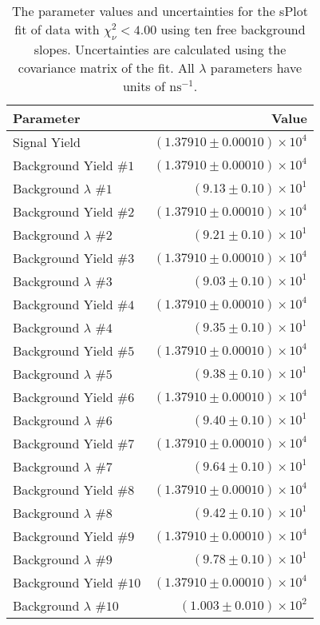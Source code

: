 
\begin{table}[h]
    \begin{center}
        \begin{tabular}{lr}\toprule
            Parameter & Value \\\midrule
            Signal Yield & $(1.37910 \pm 0.00010) \times 10^{4}$ \\
            Background Yield $\#1$ & $(1.37910 \pm 0.00010) \times 10^{4}$ \\
            Background $\lambda$ $\#1$ & $(9.13 \pm 0.10) \times 10^{1}$ \\
            Background Yield $\#2$ & $(1.37910 \pm 0.00010) \times 10^{4}$ \\
            Background $\lambda$ $\#2$ & $(9.21 \pm 0.10) \times 10^{1}$ \\
            Background Yield $\#3$ & $(1.37910 \pm 0.00010) \times 10^{4}$ \\
            Background $\lambda$ $\#3$ & $(9.03 \pm 0.10) \times 10^{1}$ \\
            Background Yield $\#4$ & $(1.37910 \pm 0.00010) \times 10^{4}$ \\
            Background $\lambda$ $\#4$ & $(9.35 \pm 0.10) \times 10^{1}$ \\
            Background Yield $\#5$ & $(1.37910 \pm 0.00010) \times 10^{4}$ \\
            Background $\lambda$ $\#5$ & $(9.38 \pm 0.10) \times 10^{1}$ \\
            Background Yield $\#6$ & $(1.37910 \pm 0.00010) \times 10^{4}$ \\
            Background $\lambda$ $\#6$ & $(9.40 \pm 0.10) \times 10^{1}$ \\
            Background Yield $\#7$ & $(1.37910 \pm 0.00010) \times 10^{4}$ \\
            Background $\lambda$ $\#7$ & $(9.64 \pm 0.10) \times 10^{1}$ \\
            Background Yield $\#8$ & $(1.37910 \pm 0.00010) \times 10^{4}$ \\
            Background $\lambda$ $\#8$ & $(9.42 \pm 0.10) \times 10^{1}$ \\
            Background Yield $\#9$ & $(1.37910 \pm 0.00010) \times 10^{4}$ \\
            Background $\lambda$ $\#9$ & $(9.78 \pm 0.10) \times 10^{1}$ \\
            Background Yield $\#10$ & $(1.37910 \pm 0.00010) \times 10^{4}$ \\
            Background $\lambda$ $\#10$ & $(1.003 \pm 0.010) \times 10^{2}$ \\\bottomrule
        \end{tabular}
        \caption{The parameter values and uncertainties for the sPlot fit of data with $\chi^2_\nu < 4.00$ using ten free background slopes. Uncertainties are calculated using the covariance matrix of the fit. All $\lambda$ parameters have units of $\si{\nano\second}^{-1}$.}
    \end{center}
\end{table}
